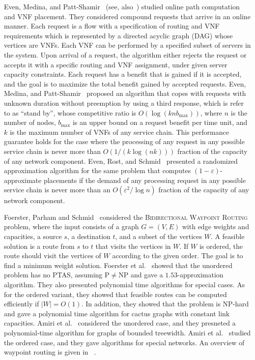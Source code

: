 \documentclass[11pt]{article}
\newcommand{\abs}[1]{\left| #1 \right|}
\newcommand{\eps}{\varepsilon}
\begin{document}
Even, Medina, and Patt-Shamir~\cite{EMP16} (see, also~\cite{EMP18})
studied online path computation and VNF placement.  They considered
compound requests that arrive in an online manner.  Each request is a
flow with a specification of routing and VNF requirements which is
represented by a directed acyclic graph (DAG) whose vertices are VNFs.
Each VNF can be performed by a specified subset of servers in the
system.  Upon arrival of a request, the algorithm either rejects the
request or accepts it with a specific routing and VNF assignment,
under given server capacity constraints.  Each request has a benefit
that is gained if it is accepted, and the goal is to maximize the
total benefit gained by accepted requests.
%
Even, Medina, and Patt-Shamir~\cite{EMP16} proposed an algorithm that
copes with requests with unknown duration without preemption by using
a third response, which is refer to as “stand by”, whose competitive
ratio is $O(\log (knb_{\max}))$, where $n$ is the number of nodes,
$b_{\max}$ is an upper bound on a request benefit per time unit, and
$k$ is the maximum number of VNFs of any service chain.  This
performance guarantee holds for the case where the processing of any
request in any possible service chain is never more than
$O(1/(k \log (nk)))$ fraction of the capacity of any network
component.
%
Even, Rost, and Schmid~\cite{ERS16} presented a randomized
approximation algorithm for the same problem that computes
$(1-\eps)$-approximate placements if the demand of any processing
request in any possible service chain is never more than an
$O(\eps^2/\log n)$ fraction of the capacity of any network component.

Foerster, Parham and Schmid~\cite{FPS17} considered the
\textsc{Bidirectional Waypoint Routing} problem, where the input
consists of a graph $G = (V,E)$ with edge weights and capacities, a
source $s$, a destination $t$, and a subset of the vertices $W$.  A
feasible solution is a route from $s$ to $t$ that visits the vertices
in $W$.  If $W$ is ordered, the route should visit the vertices of $W$
according to the given order.  The goal is to find a minimum weight
solution.
%
Foerster et al.~\cite{FPS17} showed that the unordered
problem has no PTAS, assuming P$\neq$NP and gave a
$1.53$-approximation algorithm.  They also presented polynomial time
algorithms for special cases.
%
As for the ordered variant, they showed that feasible routes can be
computed efficiently if $\abs{W} = O(1)$.  In addition, they showed
that the problem is NP-hard and gave a polynomial time algorithm for
cactus graphs with constant link capacities.
%
Amiri et al.~\cite{AFS18} considered the unordered case, and they
presneted a polynomial-time algorithm for graphs of bounded treewidth.
%
Amiri et al.~\cite{AFJPS18} studied the ordered case, and they
gave algorithms for special networks.
%
An overview of waypoint routing is given in ~\cite{AFJS18}.
\end{document}
